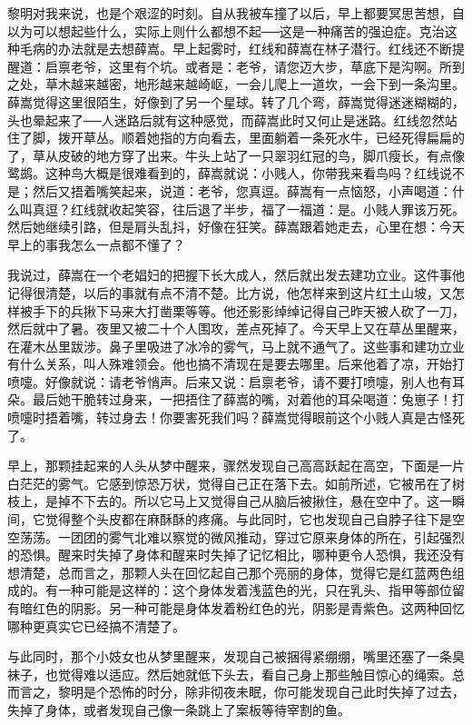 黎明对我来说，也是个艰涩的时刻。自从我被车撞了以后，早上都要冥思苦想，自以为可以想起些什么，实际上则什么都想不起──这是一种痛苦的强迫症。克治这种毛病的办法就是去想薛嵩。早上起雾时，红线和薛嵩在林子潜行。红线还不断提醒道：启禀老爷，这里有个坑。或者是：老爷，请您迈大步，草底下是沟啊。所到之处，草木越来越密，地形越来越崎岖，一会儿爬上一道坎，一会下到一条沟里。薛嵩觉得这里很陌生，好像到了另一个星球。转了几个弯，薛嵩觉得迷迷糊糊的，头也晕起来了──人迷路后就有这种感觉，而薛嵩此时又何止是迷路。红线忽然站住了脚，拨开草丛。顺着她指的方向看去，里面躺着一条死水牛，已经死得扁扁的了，草从皮破的地方穿了出来。牛头上站了一只翠羽红冠的鸟，脚爪瘦长，有点像鹭鹚。这种鸟大概是很难看到的，薛嵩就说：小贱人，你带我来看鸟吗？红线说不是；然后又捂着嘴笑起来，说道：老爷，您真逗。薛嵩有一点恼怒，小声喝道：什么叫真逗？红线就收起笑容，往后退了半步，福了一福道：是。小贱人罪该万死。然后她继续引路，但是肩头乱抖，好像在狂笑。薛嵩跟着她走去，心里在想：今天早上的事我怎么一点都不懂了？ 

我说过，薛嵩在一个老娼妇的把握下长大成人，然后就出发去建功立业。这件事他记得很清楚，以后的事就有点不清不楚。比方说，他怎样来到这片红土山坡，又怎样被手下的兵揪下马来大打凿栗等等。他还影影绰绰记得自己昨天被人砍了一刀，然后就中了暑。夜里又被二十个人围攻，差点死掉了。今天早上又在草丛里醒来，在灌木丛里跋涉。鼻子里吸进了冰冷的雾气，马上就不通气了。这些事和建功立业有什么关系，叫人殊难领会。他也搞不清现在是要去哪里。后来他着了凉，开始打喷嚏。好像就说：请老爷悄声。后来又说：启禀老爷，请不要打喷嚏，别人也有耳朵。最后她干脆转过身来，一把捂住了薛嵩的嘴，对着他的耳朵喝道：兔崽子！打喷嚏时捂着嘴，转过身去！你要害死我们吗？薛嵩觉得眼前这个小贱人真是古怪死了。 

早上，那颗挂起来的人头从梦中醒来，骤然发现自己高高跃起在高空，下面是一片白茫茫的雾气。它感到惊恐万状，觉得自己正在落下去。如前所述，它被吊在了树枝上，是掉不下去的。所以它马上又觉得自己从脑后被揪住，悬在空中了。这一瞬间，它觉得整个头皮都在麻酥酥的疼痛。与此同时，它也发现自己自脖子往下是空空荡荡。一团团的雾气北难以察觉的微风推动，穿过它原来身体的所在，引起强烈的恐惧。醒来时失掉了身体和醒来时失掉了记忆相比，哪种更令人恐惧，我还没有想清楚，总而言之，那颗人头在回忆起自己那个亮丽的身体，觉得它是红蓝两色组成的。有一种可能是这样的：这个身体发着浅蓝色的光，只在乳头、指甲等部位留有暗红色的阴影。另一种可能是身体发着粉红色的光，阴影是青紫色。这两种回忆哪种更真实它已经搞不清楚了。 

与此同时，那个小妓女也从梦里醒来，发现自己被捆得紧绷绷，嘴里还塞了一条臭袜子，也觉得难以适应。然后她就低下头去，看自己身上那些触目惊心的绳索。总而言之，黎明是个恐怖的时分，除非彻夜未眠，你可能发现自己此时失掉了过去，失掉了身体，或者发现自己像一条跳上了案板等待宰割的鱼。 

